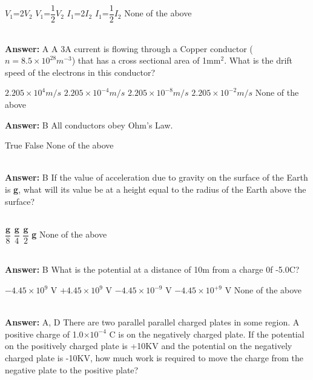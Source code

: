 \documentclass[11pt,addpoints]{exam}
\begin{document}
{{{\begin{questions}
\begin{oneparchoices}
						\choice $V_1$=2$V_2$
						\choice $V_1$=$\dfrac{1}{2}$$V_2$
						\choice $I_1$=2$I_2$
						\choice $I_1$=$\dfrac{1}{2}$$I_2$
						\choice None of the above
					\end{oneparchoices}
					\\ \textbf{Answer:} A
					\question A 3A current is flowing through a Copper conductor ($n= 8.5\times10^{28}m^{-3}$) that has a cross sectional area of 1mm$^2$. What is the drift speed of the electrons in this conductor?\\
					\begin{oneparchoices}
						\choice $2.205\times10^{4}m/s$
						\choice $2.205\times10^{-4}m/s$
						\choice $2.205\times10^{-8}m/s$
						\choice $2.205\times10^{-2}m/s$
						\choice None of the above
					\end{oneparchoices} \textbf{Answer:} B
					\question All conductors obey Ohm's Law.\\
					\begin{oneparchoices}
						\choice True
						\choice False
						\choice None of the above
					\end{oneparchoices} \\ \textbf{Answer:} B
					\question If the value of acceleration due to gravity on the surface of the Earth is \textbf{g}, what will its value be at a height equal to the radius of the Earth above the surface?\\ \\
					\begin{oneparchoices}
						\choice $\dfrac{\textbf{g}}{8}$
						\choice $\dfrac{\textbf{g}}{4}$
						\choice $\dfrac{\textbf{g}}{2}$
						\choice \textbf{g}
						\choice None of the above
					\end{oneparchoices}
					\\ \textbf{Answer:} B
					\question What is the potential at a distance of 10m from a charge 0f -5.0C?\\
					\begin{oneparchoices}
						\choice $-4.45\times10^{9}$ V
						\choice $+4.45\times10^{9}$ V
						\choice $-4.45\times10^{-9}$ V
						\choice $-4.45\times10^{+9}$ V
						\choice None of the above
					\end{oneparchoices}\\ \textbf{Answer:} A, D
					\question There are two parallel parallel charged plates in some region. A positive charge of 1.0$\times10^{-4}$ C is on the negatively charged plate. If the potential on the positively charged plate is +10KV and the potential on the negatively charged plate is -10KV, how much work is required to move the charge from the negative plate to the positive plate?\\

\end{questions}}}}
\end{document}
